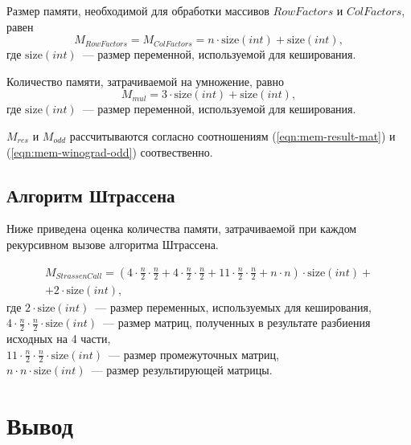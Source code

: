 Размер памяти, необходимой для обработки массивов $RowFactors$ и $ColFactors$, равен
\begin{equation}
    M_{RowFactors} = M_{ColFactors} = n \cdot \text{size}(int) + \text{size}(int),
\end{equation}
где $\text{size}(int)$~--- размер переменной, используемой для кеширования.

Количество памяти, затрачиваемой на умножение, равно
\begin{equation}
    M_{mul} = 3 \cdot \text{size}(int) + \text{size}(int),
\end{equation}
где $\text{size}(int)$~--- размер переменной, используемой для кеширования.

$M_{res}$ и $M_{odd}$ рассчитываются согласно соотношениям (\ref{eqn:mem-result-mat}) и (\ref{eqn:mem-winograd-odd}) соотвественно.

\subsection{Алгоритм Штрассена}

Ниже приведена оценка количества памяти, затрачиваемой при каждом рекурсивном вызове алгоритма Штрассена.

\begin{equation}
    \begin{gathered}
        M_{StrassenCall} = (4 \cdot \frac{n}{2} \cdot \frac{n}{2} + 4 \cdot \frac{n}{2} \cdot \frac{n}{2} + 11 \cdot \frac{n}{2} \cdot \frac{n}{2} + n \cdot n) \cdot \text{size}(int) + \\
        + 2 \cdot \text{size}(int),
    \end{gathered}
\end{equation}
где $2 \cdot \text{size}(int)$~--- размер переменных, используемых для кеширования,
\\ $4 \cdot \frac{n}{2} \cdot \frac{n}{2} \cdot \text{size}(int)$~--- размер матриц, полученных в результате разбиения исходных на 4 части,
\\ $11 \cdot \frac{n}{2} \cdot \frac{n}{2} \cdot \text{size}(int)$~--- размер промежуточных матриц,
\\ $n \cdot n \cdot \text{size}(int)$~--- размер результирующей матрицы.

\section{Вывод}

